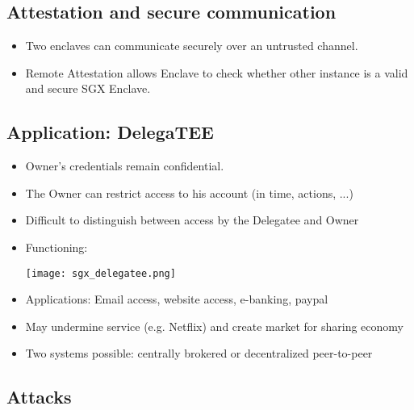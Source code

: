 \subsection{Attestation and secure communication}
\begin{itemize}
  \item Two enclaves can communicate securely over an untrusted channel.
  \item Remote Attestation allows Enclave to check whether other instance is a
    valid and secure SGX Enclave.
\end{itemize}

\subsection{Application: DelegaTEE}
\begin{itemize}
  \item Owner's credentials remain confidential.
  \item The Owner can restrict access to his account (in time, actions,
    ...)
  \item Difficult to distinguish between access by the
    Delegatee and Owner
  \item Functioning:
    \begin{center}
      \texttt{[image: sgx\_delegatee.png]}
    \end{center}
  \item Applications: Email access, website access, e-banking, paypal
  \item May undermine service (e.g. Netflix) and create market for sharing
    economy
  \item Two systems possible: centrally brokered or decentralized
    peer-to-peer
\end{itemize}

\subsection{Attacks}
